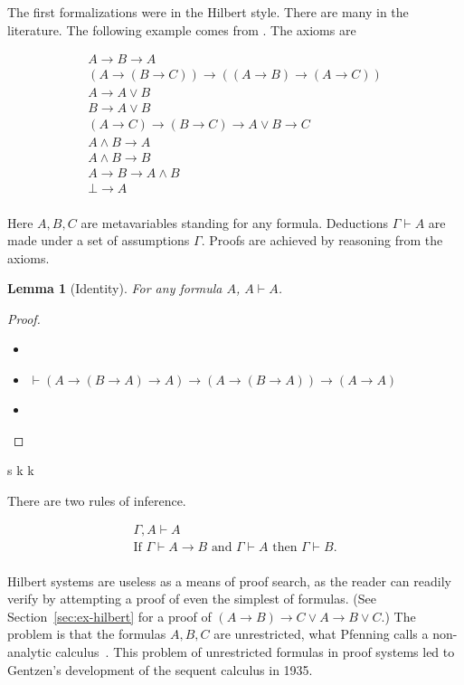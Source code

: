\documentclass[]{article}
\newcommand{\And}{\wedge}
\newcommand{\Or}{\vee}
\newcommand{\Imp}{\rightarrow}
\newcommand{\Bot}{\bot}
\newcommand{\Hil}[2][]{#1 \vdash #2}
\newtheorem{lemma}[theorem]{Lemma}
\begin{document}
The first formalizations were in the Hilbert style.  There are
many in the literature.  The following example comes from
\cite[Section 2.4]{Troelstra.2000.ProofTheory}.  The axioms are

\[
\begin{array}{l}
  A \Imp B \Imp A \\
  (A \Imp (B \Imp C)) \Imp ((A \Imp B) \Imp (A \Imp C)) \\
  A \Imp A \Or B \\
  B \Imp A \Or B \\
  (A \Imp C) \Imp (B \Imp C)  \Imp A \Or B \Imp C \\
  A \And B \Imp A\\
  A \And B \Imp B\\
  A \Imp B \Imp A \And B\\
  \Bot \Imp A\\
\end{array}
\]

Here $A,B,C$ are metavariables standing for any formula.
Deductions $\Hil[\Gamma]{A}$ are made under a set of assumptions $\Gamma$.
Proofs are achieved by reasoning from the axioms.

\begin{lemma}[Identity]
  For any formula $A$, $\Hil[A]{A}$.
\end{lemma}
\begin{proof}
  \begin{itemize}
  \item[]
  \item[1.]
    $\Hil[]{(A \Imp (B \Imp A) \Imp A) \Imp (A \Imp (B \Imp A)) \Imp
      (A \Imp A)}$
  \item[2.]
  \end{itemize}
\end{proof}

s k k

There are two rules of inference.

\[
\begin{array}{l}
  \Hil[\Gamma,A]{A} \\
  \mbox{If } \Hil[\Gamma]{A \Imp B} \mbox{ and } \Hil[\Gamma]{A}
  \mbox{ then } \Hil[\Gamma]{B}. \\
\end{array}
\]

Hilbert systems are useless as a means of proof search, as the reader
can readily verify by attempting a proof of even the simplest
of formulas.  (See Section~\ref{sec:ex-hilbert} for a proof
of $(A \Imp B) \Imp C \Or A \Imp B \Or C$.)  The problem is that
the formulas $A,B,C$ are unrestricted, what Pfenning calls
a non-analytic calculus~\cite{Pfenning.1984.CADE}.  This problem of
unrestricted formulas in proof systems led to Gentzen's development of
the sequent calculus in 1935.
\end{document}
